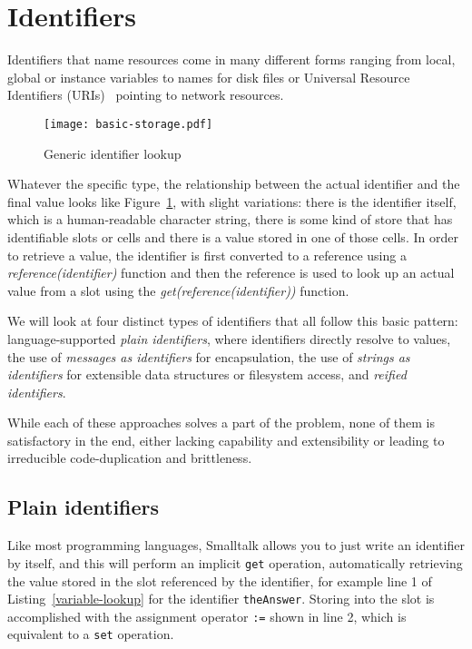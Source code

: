 \documentclass[preprint,authoryear]{llncs}
\begin{document}





\section{Identifiers}
\label{identifiers}


Identifiers that name resources come in many different forms ranging from local,
global or instance variables to names for disk files or Universal Resource Identifiers (URIs)~\cite{rfc3986} pointing to network resources.

\begin{figure}[htbp]
\centering
\texttt{[image: basic-storage.pdf]}
\caption{Generic identifier lookup}
\label{identifier-eval}

\end{figure}

Whatever the specific type, the relationship between the actual identifier and the
final value looks like Figure~\ref{identifier-eval}, with slight variations:   there is 
the identifier itself, which is a human-readable character string, there is some kind
of store that has identifiable slots or cells and there is a value stored in one of those
cells.   In order to retrieve a value, the identifier is first converted to a reference using a
 \emph{reference(identifier)} function and then the reference is used to look up an actual
value from a slot using the \emph{get(reference(identifier))} function.


We will look at four distinct types of identifiers that all follow this basic pattern:  language-supported 
\emph{plain identifiers}, where identifiers directly resolve to values, the use of \emph{messages as identifiers} 
for encapsulation, the use of \emph{strings as identifiers} for extensible data structures or filesystem access, and
\emph{reified identifiers}.

 While each of these approaches solves a part of the problem,
none of them is satisfactory in the end, either lacking capability and extensibility or leading to
irreducible code-duplication and brittleness.

\subsection{Plain identifiers}
\label{direct-reference}
Like most programming languages, Smalltalk allows you to just write 
an identifier by itself, and this will perform an implicit {\tt get} operation, automatically retrieving the value stored in the slot referenced by the identifier, for
example line 1 of Listing~\ref{variable-lookup} for the identifier {\tt theAnswer}.
Storing into the slot is accomplished with
the assignment operator {\tt :=} shown in line 2, which is equivalent to a {\tt set} operation.
\end{document}
